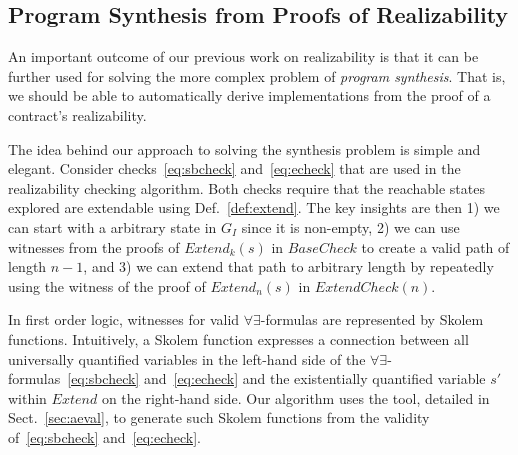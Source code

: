 \subsection{Program Synthesis from Proofs of Realizability}

An important outcome of our previous work on realizability is that it
can be further used for solving the more complex problem of
\emph{program synthesis}. That is, we should be able to automatically
derive implementations from the proof of a contract's realizability.

The idea behind our approach to solving the synthesis problem is
simple and elegant. Consider checks~\eqref{eq:sbcheck}
and~\eqref{eq:echeck} that are used in the realizability checking
algorithm. Both checks require that the reachable states explored are
extendable using Def.~\ref{def:extend}. The key insights are then 1)
we can start with a arbitrary state in $G_I$ since it is non-empty, 2)
we can use witnesses from the proofs of $\mathit{Extend}_k(s)$ in
$\mathit{BaseCheck}$ to create a valid path of length $n-1$, and 3) we
can extend that path to arbitrary length by repeatedly using the
witness of the proof of $\mathit{Extend}_n(s)$ in
$\mathit{ExtendCheck}(n)$.

In first order logic, witnesses for valid $\forall\exists$-formulas
are represented by Skolem functions. Intuitively, a Skolem function
expresses a connection between all universally quantified variables in
the left-hand side of the $\forall\exists$-formulas~\eqref{eq:sbcheck}
and~\eqref{eq:echeck} and the existentially quantified variable $s'$
within $\mathit{Extend}$ on the right-hand side. Our algorithm uses
the \aeval tool, detailed in Sect.~\ref{sec:aeval}, to generate such
Skolem functions from the validity of~\eqref{eq:sbcheck}
and~\eqref{eq:echeck}.




